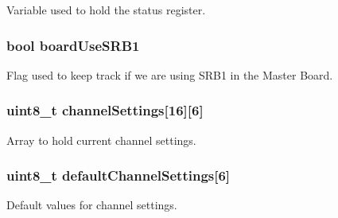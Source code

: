 Variable used to hold the status register. 

\hypertarget{group___a_d_s1299___library_ga1e02fad8a694c8bbfeba493b8be214e4}{}
\subsubsection[{board\+Use\+S\+R\+B1}]{\setlength{\rightskip}{0pt plus 5cm}bool board\+Use\+S\+R\+B1}\label{group___a_d_s1299___library_ga1e02fad8a694c8bbfeba493b8be214e4}


Flag used to keep track if we are using S\+R\+B1 in the Master Board. 

\hypertarget{group___a_d_s1299___library_ga301925f8d0be3a235549a1d8a2775909}{}
\subsubsection[{channel\+Settings}]{\setlength{\rightskip}{0pt plus 5cm}uint8\+\_\+t channel\+Settings\mbox{[}16\mbox{]}\mbox{[}6\mbox{]}}\label{group___a_d_s1299___library_ga301925f8d0be3a235549a1d8a2775909}


Array to hold current channel settings. 

\hypertarget{group___a_d_s1299___library_ga0ec603fb6c5e40febc9a5139ef12969b}{}
\subsubsection[{default\+Channel\+Settings}]{\setlength{\rightskip}{0pt plus 5cm}uint8\+\_\+t default\+Channel\+Settings\mbox{[}6\mbox{]}}\label{group___a_d_s1299___library_ga0ec603fb6c5e40febc9a5139ef12969b}


Default values for channel settings. 

\hypertarget{group___a_d_s1299___library_gadc787c1c2290ed1c985a4dc4cde9f1a3}{}
